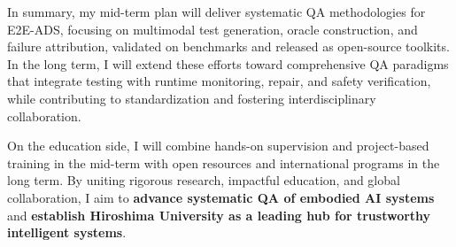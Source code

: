 \documentclass[12pt,a4paper]{article}
\begin{document}
In summary, my mid-term plan will deliver systematic QA methodologies for E2E-ADS, focusing on multimodal test generation, oracle construction, and failure attribution, validated on benchmarks and released as open-source toolkits. In the long term, I will extend these efforts toward comprehensive QA paradigms that integrate testing with runtime monitoring, repair, and safety verification, while contributing to standardization and fostering interdisciplinary collaboration.

On the education side, I will combine hands-on supervision and project-based training in the mid-term with open resources and international programs in the long term. By uniting rigorous research, impactful education, and global collaboration, I aim to \textbf{advance systematic QA of embodied AI systems} and \textbf{establish Hiroshima University as a leading hub for trustworthy intelligent systems}.





 
\end{document}
